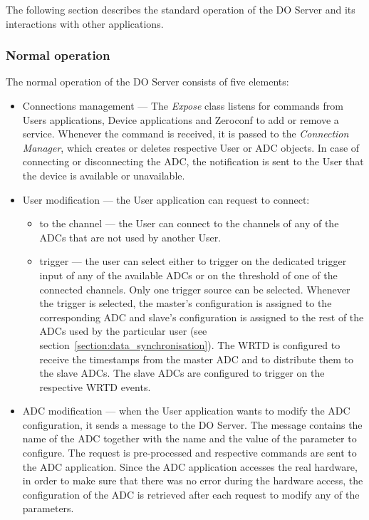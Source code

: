         The following section describes the standard operation of the DO Server and its interactions with other applications.
        
        \subsubsection{Normal operation}
            The normal operation of the DO Server consists of five elements:
            \begin{itemize}
                \item Connections management --- The \textit{Expose} class listens for commands from Users applications, Device applications and Zeroconf to add or remove a service. Whenever the command is received, it is passed to the \textit{Connection Manager}, which creates or deletes respective User or ADC objects. In case of connecting or disconnecting the ADC, the notification is sent to the User that the device is available or unavailable. 
                
                \item User modification --- the User application can request to connect:
                \begin{itemize}
                    \item to the channel --- the User can connect to the channels of any of the ADCs that are not used by another User.
                    \item trigger --- the user can select either to trigger on the dedicated trigger input of any of the available ADCs or on the threshold of one of the connected channels. Only one trigger source can be selected. Whenever the trigger is selected, the master's configuration is assigned to the corresponding ADC and slave's configuration is assigned to the rest of the ADCs used by the particular user (see section~\ref{section:data_synchronisation}). The WRTD is configured to receive the timestamps from the master ADC and to distribute them to the slave ADCs. The slave ADCs are configured to trigger on the respective WRTD events.
                \end{itemize}
                
                \item ADC modification --- when the User application wants to modify the ADC configuration, it sends a message to the DO Server. The message contains the name of the ADC together with the name and the value of the parameter to configure. The request is pre-processed and respective commands are sent to the ADC application. Since the ADC application accesses the real hardware, in order to make sure that there was no error during the hardware access, the configuration of the ADC is retrieved after each request to modify any of the parameters. 
                

\end{itemize}

